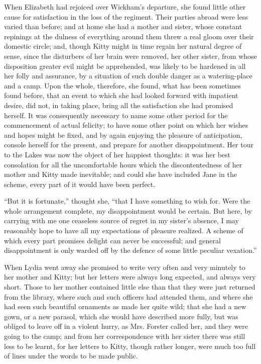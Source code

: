 When Elizabeth had rejoiced over Wickham's departure, she found little other cause for satisfaction in the loss of the regiment. Their parties abroad were less varied than before; and at home she had a mother and sister, whose constant repinings at the dulness of everything around them threw a real gloom over their domestic circle; and, though Kitty might in time regain her natural degree of sense, since the disturbers of her brain were removed, her other sister, from whose disposition greater evil might be apprehended, was likely to be hardened in all her folly and assurance, by a situation of such double danger as a watering-place and a camp. Upon the whole, therefore, she found, what has been sometimes found before, that an event to which she had looked forward with impatient desire, did not, in taking place, bring all the satisfaction she had promised herself. It was consequently necessary to name some other period for the commencement of actual felicity; to have some other point on which her wishes and hopes might be fixed, and by again enjoying the pleasure of anticipation, console herself for the present, and prepare for another disappointment. Her tour to the Lakes was now the object of her happiest thoughts: it was her best consolation for all the uncomfortable hours which the discontentedness of her mother and Kitty made inevitable; and could she have included Jane in the scheme, every part of it would have been perfect.

``But it is fortunate,'' thought she, ``that I have something to wish for. Were the whole arrangement complete, my disappointment would be certain. But here, by carrying with me one ceaseless source of regret in my sister's absence, I may reasonably hope to have all my expectations of pleasure realized. A scheme of which every part promises delight can never be successful; and general disappointment is only warded off by the defence of some little peculiar vexation.''

When Lydia went away she promised to write very often and very minutely to her mother and Kitty; but her letters were always long expected, and always very short. Those to her mother contained little else than that they were just returned from the library, where such and such officers had attended them, and where she had seen such beautiful ornaments as made her quite wild; that she had a new gown, or a new parasol, which she would have described more fully, but was obliged to leave off in a violent hurry, as Mrs. Forster called her, and they were going to the camp; and from her correspondence with her sister there was still less to be learnt, for her letters to Kitty, though rather longer, were much too full of lines under the words to be made public.

